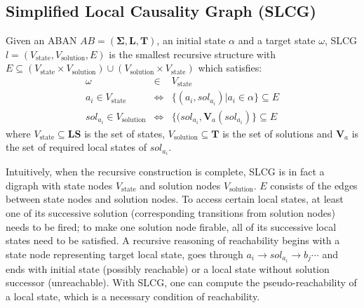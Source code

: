 \documentclass[runningheads]{llncs}
\begin{document}
\subsection{Simplified Local Causality Graph (SLCG)}
\begin{definition}[SLCG]\label{defSLCG}
Given an ABAN $AB =(\mathbf{\Sigma},\mathbf{L},\mathbf{T})$, an initial state $\alpha$ and a target state $\omega$, SLCG $l=(V_{\mathrm{state}},V_{\mathrm{solution}},E)$ is the smallest recursive structure with $E \subseteq(V_{\mathrm{state}}\times V_{\mathrm{solution}})\cup(V_{\mathrm{solution}}\times V_{\mathrm{state}})$ which satisfies:
\begin{eqnarray*}
    \omega&\in& V_{\mathrm{state}} \\
    a_i\in V_{\mathrm{state}} &\Leftrightarrow& \{(a_i, sol_{a_i})| a_i\in \alpha\}\subseteq E \\
    sol_{a_i}\in V_{\mathrm{solution}}&\Leftrightarrow& \{(sol_{a_i},\mathbf{V}_a(sol_{a_i})\}\subseteq E
\end{eqnarray*}
where $V_{\mathrm{state}}\subseteq\mathbf{LS}$ is the set of states, $V_{\mathrm{solution}}\subseteq \mathbf{T}$ is the set of solutions and $\mathbf{V}_a$ is the set of required local states of $sol_{a_i}$.
\end{definition}
Intuitively, when the recursive construction is complete, SLCG is in fact a digraph with state nodes $V_{\mathrm{state}}$ and solution nodes $V_{\mathrm{solution}}$. 
$E$ consists of the edges between state nodes and solution nodes. 
To access certain local states, at least one of its successive solution (corresponding transitions from solution nodes) needs to be fired; to make one solution node firable, all of its successive local states need to be satisfied. 
A recursive reasoning of reachability begins with a state node representing target local state, goes through $a_i\to sol_{a_i}\to b_j \cdots$ and ends with initial state (possibly reachable) or a local state without solution successor (unreachable). 
With SLCG, one can compute the pseudo-reachability of a local state, which is a necessary condition of reachability.
\end{document}

